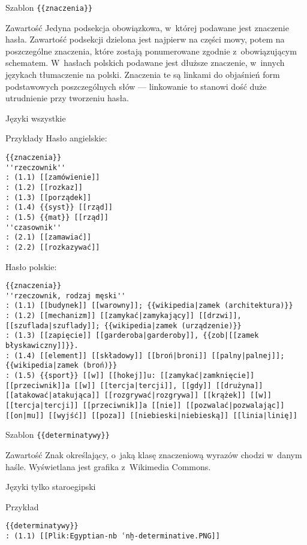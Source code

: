 \begin{opis}
	\item[Szablon] \verb|{{znaczenia}}|
	\item[Zawartość] Jedyna podsekcja obowiązkowa, w~której podawane jest znaczenie hasła. Zawartość podsekcji dzielona jest najpierw na części mowy, potem na poszczególne znaczenia, które zostają ponumerowane zgodnie z~obowiązującym schematem. W~hasłach polskich podawane jest dłuższe znaczenie, w~innych językach tłumaczenie na polski. Znaczenia te są linkami do objaśnień form podstawowych poszczególnych słów --- linkowanie to stanowi dość duże utrudnienie przy tworzeniu hasła.
	\item[Języki] wszystkie
	\item[Przykłady] Hasło angielskie:
\begin{lstlisting}
{{znaczenia}}
''rzeczownik''
: (1.1) [[zamówienie]]
: (1.2) [[rozkaz]]
: (1.3) [[porządek]]
: (1.4) {{syst}} [[rząd]]
: (1.5) {{mat}} [[rząd]]
''czasownik''
: (2.1) [[zamawiać]]
: (2.2) [[rozkazywać]]
\end{lstlisting}
		Hasło polskie:
\begin{lstlisting}
{{znaczenia}}
''rzeczownik, rodzaj męski''
: (1.1) [[budynek]] [[warowny]]; {{wikipedia|zamek (architektura)}}
: (1.2) [[mechanizm]] [[zamykać|zamykający]] [[drzwi]], [[szuflada|szuflady]]; {{wikipedia|zamek (urządzenie)}}
: (1.3) [[zapięcie]] [[garderoba|garderoby]], {{zob|[[zamek błyskawiczny]]}}.
: (1.4) [[element]] [[składowy]] [[broń|broni]] [[palny|palnej]]; {{wikipedia|zamek (broń)}}
: (1.5) {{sport}} [[w]] [[hokej]]u: [[zamykać|zamknięcie]] [[przeciwnik]]a [[w]] [[tercja|tercji]], [[gdy]] [[drużyna]] [[atakować|atakująca]] [[rozgrywać|rozgrywa]] [[krążek]] [[w]] [[tercja|tercji]] [[przeciwnik]]a [[nie]] [[pozwalać|pozwalając]] [[on|mu]] [[wyjść]] [[poza]] [[niebieski|niebieską]] [[linia|linię]]
\end{lstlisting}
\end{opis}
\spacer
\begin{opis}
	\item[Szablon] \verb|{{determinatywy}}|
	\item[Zawartość] Znak określający, o~jaką klasę znaczeniową wyrazów chodzi w~danym haśle. Wyświetlana jest grafika z~Wikimedia Commons.
	\item[Języki] tylko staroegipski
	\item[Przykład]
\begin{lstlisting}
{{determinatywy}}
: (1.1) [[Plik:Egyptian-nb ʿnḫ-determinative.PNG]]
\end{lstlisting}
\end{opis}
